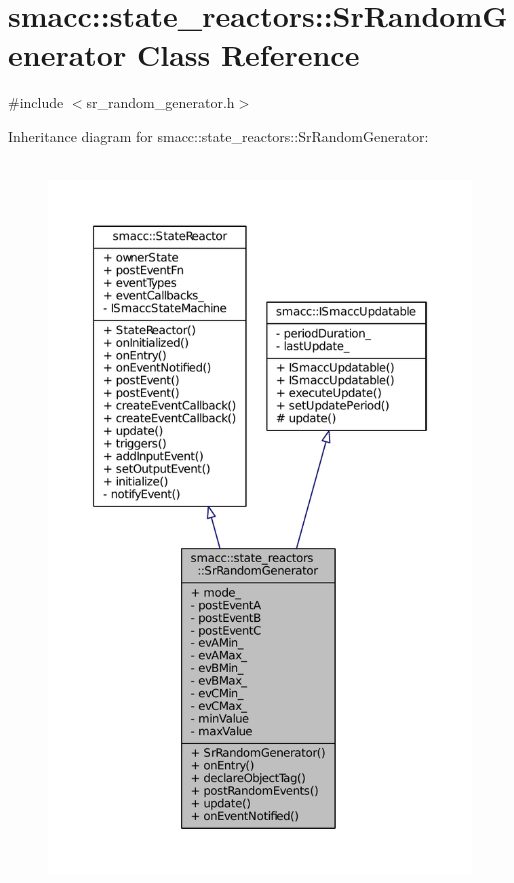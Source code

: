 \hypertarget{classsmacc_1_1state__reactors_1_1SrRandomGenerator}{}\section{smacc\+:\+:state\+\_\+reactors\+:\+:Sr\+Random\+Generator Class Reference}
\label{classsmacc_1_1state__reactors_1_1SrRandomGenerator}


{\ttfamily \#include $<$sr\+\_\+random\+\_\+generator.\+h$>$}



Inheritance diagram for smacc\+:\+:state\+\_\+reactors\+:\+:Sr\+Random\+Generator\+:
\nopagebreak
\begin{figure}[H]
\begin{center}
\leavevmode
\includegraphics[height=550pt]{classsmacc_1_1state__reactors_1_1SrRandomGenerator__inherit__graph}
\end{center}
\end{figure}


